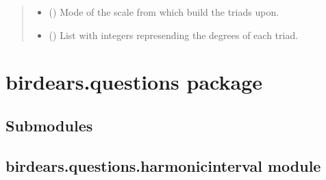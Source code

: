 \documentclass[letterpaper,10pt,english]{sphinxmanual}
\begin{document}
\begin{fulllineitems}
\begin{fulllineitems}
\begin{quote}
\begin{description}
\begin{itemize}
\item {} 
 () \textendash{} Mode of the scale from which build the triads upon.

\item {} 
 () \textendash{} List with integers represending the degrees
of each triad.

\end{itemize}

\end{description}\end{quote}

\end{fulllineitems}


\begin{fulllineitems}
\label{\detokenize{index:birdears.sequence.Sequence.play}}
\end{fulllineitems}


\end{fulllineitems}



\chapter{birdears.questions package}
\label{\detokenize{index:module-birdears.questions}}\label{\detokenize{index:birdears-questions-package}}

\section{Submodules}
\label{\detokenize{index:id12}}

\section{birdears.questions.harmonicinterval module}
\label{\detokenize{index:module-birdears.questions.harmonicinterval}}\label{\detokenize{index:birdears-questions-harmonicinterval-module}}
\end{document}
